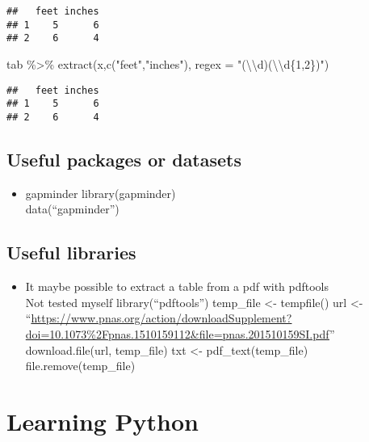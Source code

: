 \documentclass[
]{book}
\newenvironment{Shaded}{\begin{snugshade}}{\end{snugshade}}
\newcommand{\AttributeTok}[1]{\textcolor[rgb]{0.77,0.63,0.00}{#1}}
\newcommand{\FunctionTok}[1]{\textcolor[rgb]{0.00,0.00,0.00}{#1}}
\newcommand{\NormalTok}[1]{#1}
\newcommand{\SpecialCharTok}[1]{\textcolor[rgb]{0.00,0.00,0.00}{#1}}
\newcommand{\StringTok}[1]{\textcolor[rgb]{0.31,0.60,0.02}{#1}}
\providecommand{\tightlist}{%
  \setlength{\itemsep}{0pt}\setlength{\parskip}{0pt}}
\begin{document}
\begin{verbatim}
##   feet inches
## 1    5      6
## 2    6      4
\end{verbatim}

\begin{Shaded}
\begin{Highlighting}[]
\NormalTok{tab }\SpecialCharTok{\%\textgreater{}\%} \FunctionTok{extract}\NormalTok{(x,}\FunctionTok{c}\NormalTok{(}\StringTok{"feet"}\NormalTok{,}\StringTok{"inches"}\NormalTok{), }\AttributeTok{regex =} \StringTok{"(}\SpecialCharTok{\textbackslash{}\textbackslash{}}\StringTok{d)\textquotesingle{}(}\SpecialCharTok{\textbackslash{}\textbackslash{}}\StringTok{d\{1,2\})"}\NormalTok{)}
\end{Highlighting}
\end{Shaded}

\begin{verbatim}
##   feet inches
## 1    5      6
## 2    6      4
\end{verbatim}

\hypertarget{useful-packages-or-datasets}{%
\section{Useful packages or datasets}\label{useful-packages-or-datasets}}

\begin{itemize}
\tightlist
\item
  gapminder
  library(gapminder)\\
  data(``gapminder'')
\end{itemize}

\hypertarget{useful-libraries}{%
\section{Useful libraries}\label{useful-libraries}}

\begin{itemize}
\tightlist
\item
  It maybe possible to extract a table from a pdf with pdftools\\
  Not tested myself
  library(``pdftools'')
  temp\_file \textless- tempfile()
  url \textless- ``\url{https://www.pnas.org/action/downloadSupplement?doi=10.1073\%2Fpnas.1510159112\&file=pnas.201510159SI.pdf}''
  download.file(url, temp\_file)
  txt \textless- pdf\_text(temp\_file)
  file.remove(temp\_file)
\end{itemize}

\hypertarget{learning-python}{%
\chapter{Learning Python}\label{learning-python}}
\end{document}
